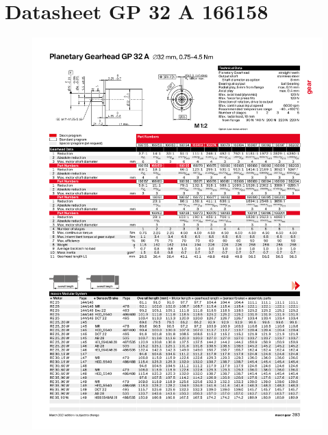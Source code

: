 \documentclass{article}
\begin{document}
  \newpage

  \section{Datasheet GP 32 A 166158}
    \label{app:datasheet transmissie}
    \begin{figure}[htbp]
      \centering %
      \includegraphics[page=1, clip, trim=0cm 0cm 0cm 0cm, scale = 0.65]{datasheet Planetary Gearhead GP 32 A 166158.pdf}
    \end{figure}
    \cite{Maxon}
\end{document}
